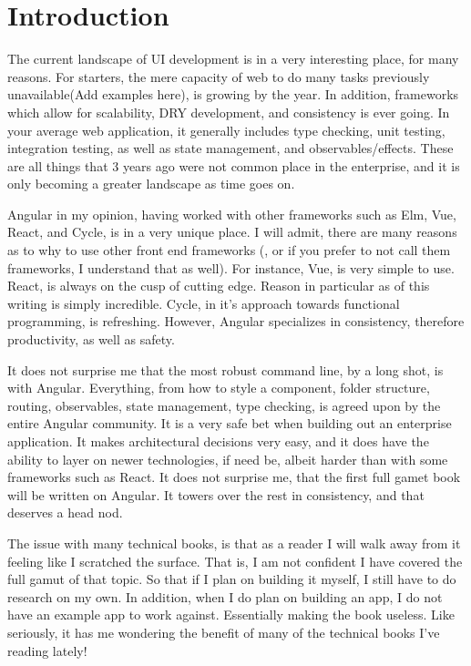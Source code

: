 \maketitle{}
\section{Introduction}

The current landscape of UI development is in a very interesting place, for many
reasons. For starters, the mere capacity of web to do many tasks previously
unavailable(Add examples here), is growing by the year. In addition, frameworks
which allow for scalability, DRY development, and consistency is ever going. In
your average web application, it generally includes type checking, unit testing,
integration testing, as well as state management, and observables/effects. These
are all things that 3 years ago were not common place in the enterprise, and it
is only becoming a greater landscape as time goes on.

Angular in my opinion, having worked with other frameworks such as Elm, Vue,
React, and Cycle, is in a very unique place. I will admit, there are many
reasons as to why to use other front end frameworks (, or if you prefer to
not call them frameworks, I understand that as well). For instance, Vue, is very
simple to use. React, is always on the cusp of cutting edge. Reason in
particular as of this writing is simply incredible. Cycle, in it's approach
towards functional programming, is refreshing. However, Angular specializes in
consistency, therefore productivity, as well as safety.

It does not surprise me that the most robust command line, by a long shot, is
with Angular. Everything, from how to style a component, folder structure,
routing, observables, state management, type checking, is agreed upon by the
entire Angular community. It is a very safe bet when building out an enterprise
application. It makes architectural decisions very easy, and it does have the
ability to layer on newer technologies, if need be, albeit harder than with some
frameworks such as React. It does not surprise me, that the first full gamet
book will be written on Angular. It towers over the rest in consistency, and
that deserves a head nod.

The issue with many technical books, is that as a reader I will walk away from
it feeling like I scratched the surface. That is, I am not confident I have
covered the full gamut of that topic. So that if I plan on building it myself,
I still have to do research on my own. In addition, when I do plan on building
an app, I do not have an example app to work against. Essentially making the
book useless. Like seriously, it has me wondering the benefit of many of the
technical books I've reading lately!

